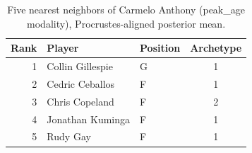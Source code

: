\begin{table}[htbp]
  \centering\small
  \begin{tabular}{rllc}
    \toprule
    Rank & Player & Position & Archetype \\
    \midrule
    1 & Collin Gillespie & G & 1 \\
    2 & Cedric Ceballos & F & 1 \\
    3 & Chris Copeland & F & 2 \\
    4 & Jonathan Kuminga & F & 1 \\
    5 & Rudy Gay & F & 1 \\
    \bottomrule
  \end{tabular}
  \caption{Five nearest neighbors of Carmelo Anthony (peak_age modality), Procrustes-aligned posterior mean.}
  \label{tab:Carmelo_Anthony_neighbors_peak_age}
\end{table}

